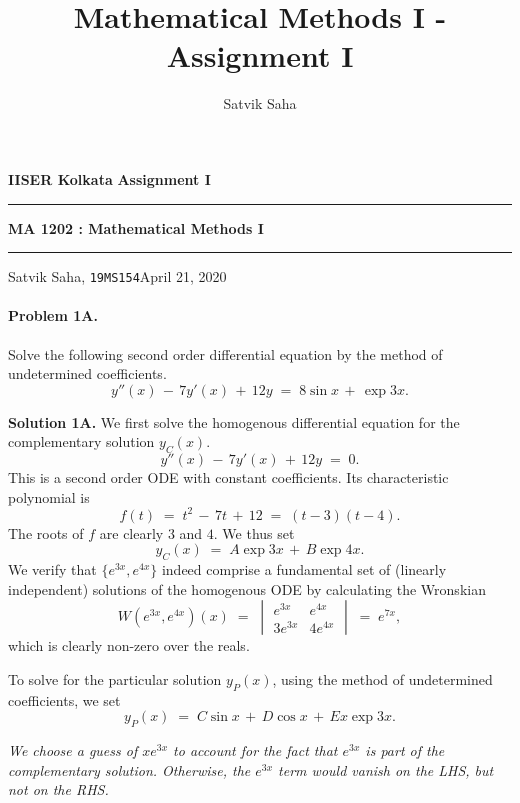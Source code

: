 \documentclass[10pt]{article}
\title{Mathematical Methods I - Assignment I}
\author{Satvik Saha}
\date{}
\begin{document}
        \par\textbf{IISER Kolkata} \hfill \textbf{Assignment I}
        \vspace{3pt}
        \hrule
        \vspace{3pt}
        \begin{center}
                \LARGE{\textbf{MA 1202 : Mathematical Methods I}}
        \end{center}
        \vspace{3pt}
        \hrule
        \vspace{3pt}
        Satvik Saha, \texttt{19MS154}\hfill April 21, 2020
        \vspace{20pt}

        \paragraph{Problem 1A.} Solve the following second order differential equation by the method of undetermined coefficients.
        \[y''(x) \,-\, 7y'(x) \,+\, 12y \;=\; 8\sin{x} \,+\, \exp{3x}.\]
        
        \textbf{Solution 1A.}
        We first solve the homogenous differential equation for the complementary solution $y_C(x)$.
        \[
        y''(x) \,-\, 7y'(x) \,+\, 12y \;=\; 0.
        \]
        This is a second order ODE with constant coefficients. Its characteristic polynomial is
        \[f(t) \;=\; t^2 \,-\, 7t \,+\, 12 \;=\; (t - 3)(t - 4).\]
        The roots of $f$ are clearly $3$ and $4$. We thus set
        \[
        y_C(x) \;=\; A\exp{3x} \,+\, B\exp{4x}.
        \]
        We verify that $\{e^{3x}, e^{4x}\}$ indeed comprise a fundamental set of (linearly independent) solutions of the homogenous ODE
        by calculating the Wronskian
        \[
        W\left(e^{3x}, e^{4x}\right)(x) \;=\; 
        \begin{vmatrix}
        e^{3x}    &       e^{4x} \\
        3e^{3x}   &       4e^{4x}
        \end{vmatrix} \;=\; e^{7x},
        \]
        which is clearly non-zero over the reals.
        
        To solve for the particular solution $y_P(x)$, using the method of undetermined coefficients, we set
        \[y_P(x) \;=\; C\sin{x} \,+\, D\cos{x} \,+\, Ex\exp{3x}.\]
        
        {\it We choose a guess of $xe^{3x}$ to account for the fact that $e^{3x}$ is part of the complementary solution.
        Otherwise, the $e^{3x}$ term would vanish on the LHS, but not on the RHS.}\\
        
\end{document}
